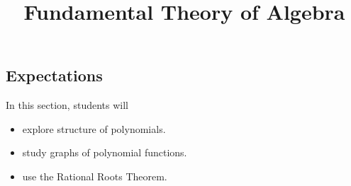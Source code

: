 \documentclass{ximera}
\title{Fundamental Theory of Algebra}
\begin{document}
\begin{abstract}
\end{abstract}
\maketitle


















\subsection{Expectations}

\begin{sectionOutcomes}
In this section, students will 

\begin{itemize}
\item explore structure of polynomials.
\item study graphs of polynomial functions.
\item use the Rational Roots Theorem.
\end{itemize}
\end{sectionOutcomes}
\end{document}
